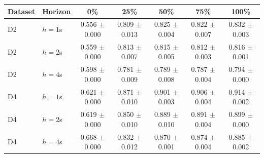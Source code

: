 \begin{tabular}{llccccc}
\toprule
Dataset & Horizon & 0\% & 25\% & 50\% & 75\% & 100\% \\
\midrule
D2 & $h=1$s & 0.556 $\pm$ 0.000 & 0.809 $\pm$ 0.013 & 0.825 $\pm$ 0.004 & 0.822 $\pm$ 0.007 & 0.832 $\pm$ 0.003 \\
D2 & $h=2$s & 0.559 $\pm$ 0.000 & 0.813 $\pm$ 0.007 & 0.815 $\pm$ 0.005 & 0.812 $\pm$ 0.003 & 0.816 $\pm$ 0.001 \\
D2 & $h=4$s & 0.598 $\pm$ 0.000 & 0.781 $\pm$ 0.009 & 0.789 $\pm$ 0.008 & 0.787 $\pm$ 0.004 & 0.794 $\pm$ 0.000 \\
\midrule
D4 & $h=1$s & 0.621 $\pm$ 0.000 & 0.871 $\pm$ 0.010 & 0.901 $\pm$ 0.003 & 0.906 $\pm$ 0.004 & 0.914 $\pm$ 0.002 \\
D4 & $h=2$s & 0.619 $\pm$ 0.000 & 0.850 $\pm$ 0.010 & 0.889 $\pm$ 0.010 & 0.891 $\pm$ 0.004 & 0.899 $\pm$ 0.000 \\
D4 & $h=4$s & 0.668 $\pm$ 0.000 & 0.832 $\pm$ 0.012 & 0.870 $\pm$ 0.001 & 0.874 $\pm$ 0.004 & 0.885 $\pm$ 0.002 \\
\bottomrule
\end{tabular}